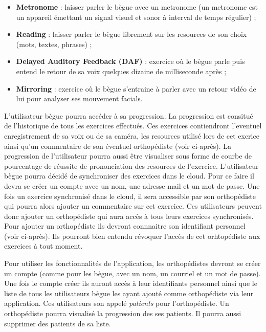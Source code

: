 \begin{itemize}
  \item \textbf{Metronome} : laisser parler le bègue avec un metronome (un metronome est un appareil émettant un signal visuel et sonor à interval de temps régulier) ;
  \item \textbf{Reading} : laisser parler le bègue librement sur les resources de son choix (mots, textes, phrases) ;
  \item \textbf{Delayed Auditory Feedback (DAF)} : exercice où le bègue parle puis entend le retour de sa voix quelques dizaine de milliseconde après ;
  \item \textbf{Mirroring} : exercice où le bègue s'entraine à parler avec un retour vidéo de lui pour analyser ses mouvement facials.
\end{itemize}

L'utilisateur bègue pourra accéder à sa progression. La progression est consitué de l'historique de tous les exercices effectués. Ces exercices contiendront l'eventuel enregistrement de sa voix ou de sa caméra, les resources utilisé lors de cet exerice ainsi qu'un commentaire de son éventuel orthopédiste (voir ci-après). La progression de l'utilisateur pourra aussi être visualiser sous forme de courbe de pourcentage de réussite de prononciation des resources de l'exercice. L'utilisateur bègue pourra décidé de synchroniser des exercices dans le cloud. Pour ce faire il devra se créer un compte avec un nom, une adresse mail et un mot de passe. Une fois un exercice synchronisé dans le cloud, il sera accessible par son orthopédiste qui pourra alors ajouter un commentaire sur cet exercice. Ces utilisateurs peuvent donc ajouter un orthopédiste qui aura accès à tous leurs exercices synchronisés. Pour ajouter un orthopédiste ils devront connnaitre son identifiant personnel (voir ci-après). Ils pourront bien entendu révoquer l'accès de cet orhtopédiste aux exercices à tout moment.

Pour utiliser les fonctionnalités de l'application, les orthopédistes devront se créer un compte (comme pour les bègue, avec un nom, un courriel et un mot de passe). Une fois le compte créer ils auront accès à leur identifiants personnel ainsi que le liste de tous les utilisateurs bègue les ayant ajouté comme orthopédiste via leur application. Ces utilisateurs son appelé \textit{patients} pour l'orthopédiste. Un orthopédiste pourra visualisé la progression des ses patients. Il pourra aussi supprimer des patients de sa liste.















